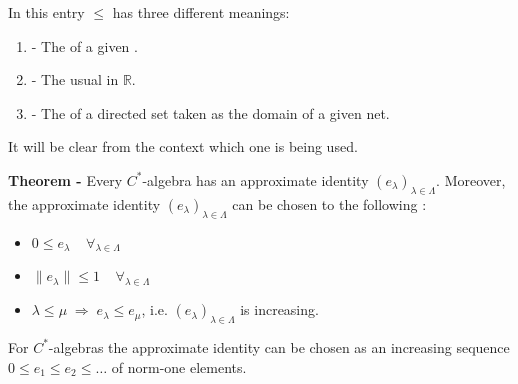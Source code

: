 \documentclass[12pt]{article}
\begin{document}
In this entry $\leq$ has three different meanings:
\begin{enumerate}
\item - The  of a given .
\item - The usual  in $\mathbb{R}$.
\item - The  of a directed set taken as the domain of a given net.
\end{enumerate}
It will be clear from the context which one is being used.

{\bf Theorem -} Every $C^*$-algebra has an approximate identity $(e_{\lambda})_{\lambda \in \Lambda}$. Moreover, the approximate identity $(e_{\lambda})_{\lambda \in \Lambda}$ can be chosen to  the following :
\begin{itemize}
\item $0\leq e_{\lambda}\;\;\;\;\forall_{\lambda \in \Lambda}$
\item $\|e_{\lambda}\| \leq 1\;\;\;\;\forall_{\lambda \in \Lambda}$
\item $\lambda \leq \mu\; \Rightarrow \;e_{\lambda}\leq e_{\mu}$, i.e. $(e_{\lambda})_{\lambda \in \Lambda}$ is increasing.
\end{itemize}

For  $C^*$-algebras the approximate identity can be chosen as an increasing sequence $0\leq e_1 \leq e_2 \leq \dots$ of norm-one elements.
\end{document}
